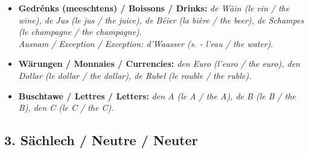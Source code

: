 \begin{itemize}
    \item \textbf{Gedrénks (meeschtens) / Boissons / Drinks:} \textit{de Wäin (le vin / the wine), de Jus (le jus / the juice), de Béier (la bière / the beer), de Schampes (le champagne / the champagne)}. \\ \textit{Ausnam / Exception / Exception: d'Waasser (s. - l'eau / the water)}.
    \item \textbf{Wärungen / Monnaies / Currencies:} \textit{den Euro (l'euro / the euro), den Dollar (le dollar / the dollar), de Rubel (le rouble / the ruble)}.
    \item \textbf{Buschtawe / Lettres / Letters:} \textit{den A (le A / the A), de B (le B / the B), den C (le C / the C)}.
\end{itemize}

\subsection*{3. Sächlech / Neutre / Neuter}
